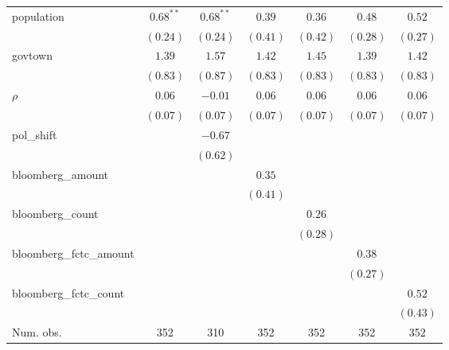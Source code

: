 \begin{table}[!h]
\begin{center}
\begin{tabular}{l c c c c c c }
population              & $0.68^{**}$  & $0.68^{**}$  & $0.39$       & $0.36$       & $0.48$       & $0.52$       \\
                        & $(0.24)$     & $(0.24)$     & $(0.41)$     & $(0.42)$     & $(0.28)$     & $(0.27)$     \\
govtown                 & $1.39$       & $1.57$       & $1.42$       & $1.45$       & $1.39$       & $1.42$       \\
                        & $(0.83)$     & $(0.87)$     & $(0.83)$     & $(0.83)$     & $(0.83)$     & $(0.83)$     \\
$\rho$                  & $0.06$       & $-0.01$      & $0.06$       & $0.06$       & $0.06$       & $0.06$       \\
                        & $(0.07)$     & $(0.07)$     & $(0.07)$     & $(0.07)$     & $(0.07)$     & $(0.07)$     \\
pol\_shift              &              & $-0.67$      &              &              &              &              \\
                        &              & $(0.62)$     &              &              &              &              \\
bloomberg\_amount       &              &              & $0.35$       &              &              &              \\
                        &              &              & $(0.41)$     &              &              &              \\
bloomberg\_count        &              &              &              & $0.26$       &              &              \\
                        &              &              &              & $(0.28)$     &              &              \\
bloomberg\_fctc\_amount &              &              &              &              & $0.38$       &              \\
                        &              &              &              &              & $(0.27)$     &              \\
bloomberg\_fctc\_count  &              &              &              &              &              & $0.52$       \\
                        &              &              &              &              &              & $(0.43)$     \\
\midrule
Num. obs.               & 352          & 310          & 352          & 352          & 352          & 352          \\

\end{tabular}
\end{center}
\end{table}

